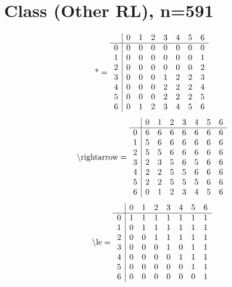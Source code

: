 \documentclass[11pt]{article}
\begin{document}
\section{Class (Other RL), n=591}
\[\text{*} = 
\begin{array}{r | r r r r r r r}
 & 0 & 1 & 2 & 3 & 4 & 5 & 6 \\ \hline
0 & 0 & 0 & 0 & 0 & 0 & 0 & 0 \\
1 & 0 & 0 & 0 & 0 & 0 & 0 & 1 \\
2 & 0 & 0 & 0 & 0 & 0 & 0 & 2 \\
3 & 0 & 0 & 0 & 1 & 2 & 2 & 3 \\
4 & 0 & 0 & 0 & 2 & 2 & 2 & 4 \\
5 & 0 & 0 & 0 & 2 & 2 & 2 & 5 \\
6 & 0 & 1 & 2 & 3 & 4 & 5 & 6 \\
\end{array}
\]
\[\text{\textbackslash rightarrow} = 
\begin{array}{r | r r r r r r r}
 & 0 & 1 & 2 & 3 & 4 & 5 & 6 \\ \hline
0 & 6 & 6 & 6 & 6 & 6 & 6 & 6 \\
1 & 5 & 6 & 6 & 6 & 6 & 6 & 6 \\
2 & 5 & 5 & 6 & 6 & 6 & 6 & 6 \\
3 & 2 & 3 & 5 & 6 & 5 & 6 & 6 \\
4 & 2 & 2 & 5 & 5 & 6 & 6 & 6 \\
5 & 2 & 2 & 5 & 5 & 5 & 6 & 6 \\
6 & 0 & 1 & 2 & 3 & 4 & 5 & 6 \\
\end{array}
\]
\[\text{\textbackslash le} = 
\begin{array}{r | r r r r r r r}
 & 0 & 1 & 2 & 3 & 4 & 5 & 6 \\ \hline
0 & 1 & 1 & 1 & 1 & 1 & 1 & 1 \\
1 & 0 & 1 & 1 & 1 & 1 & 1 & 1 \\
2 & 0 & 0 & 1 & 1 & 1 & 1 & 1 \\
3 & 0 & 0 & 0 & 1 & 0 & 1 & 1 \\
4 & 0 & 0 & 0 & 0 & 1 & 1 & 1 \\
5 & 0 & 0 & 0 & 0 & 0 & 1 & 1 \\
6 & 0 & 0 & 0 & 0 & 0 & 0 & 1 \\
\end{array}
\]
\end{document}
